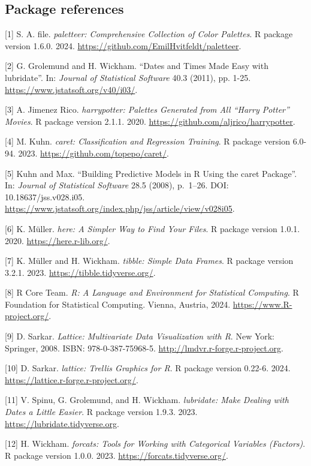 \documentclass[
  letterpaper,
  DIV=11,
  numbers=noendperiod]{scrreprt}
\begin{document}
\subsection{Package references}\label{package-references}

{[}1{]} S. A. file. \emph{paletteer: Comprehensive Collection of Color
Palettes}. R package version 1.6.0. 2024.
\url{https://github.com/EmilHvitfeldt/paletteer}.

{[}2{]} G. Grolemund and H. Wickham. ``Dates and Times Made Easy with
lubridate''. In: \emph{Journal of Statistical Software} 40.3 (2011), pp.
1-25. \url{https://www.jstatsoft.org/v40/i03/}.

{[}3{]} A. Jimenez Rico. \emph{harrypotter: Palettes Generated from All
``Harry Potter'' Movies}. R package version 2.1.1. 2020.
\url{https://github.com/aljrico/harrypotter}.

{[}4{]} M. Kuhn. \emph{caret: Classification and Regression Training}. R
package version 6.0-94. 2023. \url{https://github.com/topepo/caret/}.

{[}5{]} Kuhn and Max. ``Building Predictive Models in R Using the caret
Package''. In: \emph{Journal of Statistical Software} 28.5 (2008),
p.~1--26. DOI: 10.18637/jss.v028.i05.
\url{https://www.jstatsoft.org/index.php/jss/article/view/v028i05}.

{[}6{]} K. Müller. \emph{here: A Simpler Way to Find Your Files}. R
package version 1.0.1. 2020. \url{https://here.r-lib.org/}.

{[}7{]} K. Müller and H. Wickham. \emph{tibble: Simple Data Frames}. R
package version 3.2.1. 2023. \url{https://tibble.tidyverse.org/}.

{[}8{]} R Core Team. \emph{R: A Language and Environment for Statistical
Computing}. R Foundation for Statistical Computing. Vienna, Austria,
2024. \url{https://www.R-project.org/}.

{[}9{]} D. Sarkar. \emph{Lattice: Multivariate Data Visualization with
R}. New York: Springer, 2008. ISBN: 978-0-387-75968-5.
\url{http://lmdvr.r-forge.r-project.org}.

{[}10{]} D. Sarkar. \emph{lattice: Trellis Graphics for R}. R package
version 0.22-6. 2024. \url{https://lattice.r-forge.r-project.org/}.

{[}11{]} V. Spinu, G. Grolemund, and H. Wickham. \emph{lubridate: Make
Dealing with Dates a Little Easier}. R package version 1.9.3. 2023.
\url{https://lubridate.tidyverse.org}.

{[}12{]} H. Wickham. \emph{forcats: Tools for Working with Categorical
Variables (Factors)}. R package version 1.0.0. 2023.
\url{https://forcats.tidyverse.org/}.
\end{document}
